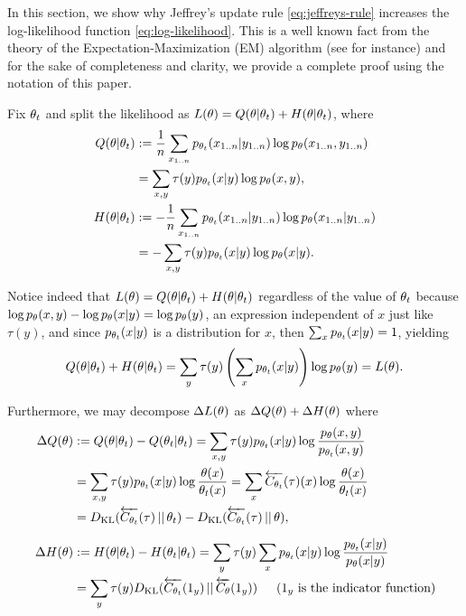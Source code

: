 \documentclass{article}
\begin{document}
In this section, we show why Jeffrey's update rule \eqref{eq:jeffreys-rule} increases the log-likelihood function \eqref{eq:log-likelihood}.
This is a well known fact from the theory of the Expectation-Maximization (EM) algorithm (see \cite{elsalamouny2020generalized,dempster1977maximum} for instance) and for the sake of completeness and clarity, we provide a complete proof using the notation of this paper.

Fix ${{\theta}_t}$ and split the likelihood as $L({\theta}) = Q({\theta}|{{\theta}_t}) + H({\theta}|{{\theta}_t})$, where
\begin{align}
    Q({\theta}|{{\theta}_t}) &:= \frac{1}{n} \sum_{{x_{1..n}}} {p_{{{\theta}_t}}}({x_{1..n}}|{y_{1..n}}) \log {p_{\ensuremath{\theta}}}({x_{1..n}},{y_{1..n}})
    \notag\\
    &= \sum_{x,y} \tau(y) {p_{{{\theta}_t}}}(x|y) \log {p_{\ensuremath{\theta}}}(x,y),
    \\
    H({\theta}|{{\theta}_t}) &:= -\frac{1}{n}\sum_{{x_{1..n}}} {p_{{{\theta}_t}}}({x_{1..n}}|{y_{1..n}}) \log {p_{\ensuremath{\theta}}}({x_{1..n}}|{y_{1..n}})
    \notag\\
    &= -\sum_{x,y} \tau(y) {p_{{{\theta}_t}}}(x|y) \log {p_{\ensuremath{\theta}}}(x|y).
\end{align}

Notice indeed that $L({\theta})=Q({\theta}|{{\theta}_t}) + H({\theta}|{{\theta}_t})$ regardless of the value of ${{\theta}_t}$ because $\log {p_{\ensuremath{\theta}}}(x,y) - \log {p_{\ensuremath{\theta}}}(x|y) = \log {p_{\ensuremath{\theta}}}(y)$, an expression independent of $x$ just like $\tau(y)$, and since ${p_{{{\theta}_t}}}(x|y)$ is a distribution for $x$, then $\sum_x {p_{{{\theta}_t}}}(x|y)=1$, yielding
\begin{equation}
    Q({\theta}|{{\theta}_t}) + H({\theta}|{{\theta}_t}) = \sum_y \tau(y) \left(\sum_x {p_{{{\theta}_t}}}(x|y)\right) \log {p_{\ensuremath{\theta}}}(y) = L({\theta}).
\end{equation}

Furthermore, we may decompose $\Delta L({\theta})$ as $\Delta Q({\theta}) + \Delta H({\theta})$ where
\begin{align}
    \Delta Q(\px) &:= Q(\px|\pxt) - Q(\pxt|\pxt)
    = \sum_{x,y} \tau(y) \ppxt(x|y) \log \frac{\ppx(x,y)}{\ppxt(x,y)}
    \notag\\
    &= \sum_{x,y} \tau(y) \ppxt(x|y) \log \frac{\px(x)}{\pxt(x)}
    = \sum_x \Cbwd[\pxt](\tau)(x) \log \frac{\px(x)}{\pxt(x)}
    \notag\\
    &= \DKL[\Cbwd[\pxt](\tau)][\px_{t}] - \DKL[\Cbwd[\pxt](\tau)][\px],\\
    \raisebox{2em}{\,}
    \Delta H(\px) &:= H(\px|\pxt) - H(\pxt|\pxt)
    = \sum_{y} \tau(y) \sum_x \ppxt(x|y) \log \frac{\ppxt(x|y)}{\ppx(x|y)}
    \notag\\
    &= \sum_{y} \tau(y) \DKL[\Cbwd[\pxt](1_y)][\Cbwd[\px](1_y)]
    \hspace{1.5em}(1_y\text{ is the indicator function)}
\end{align}
\end{document}
